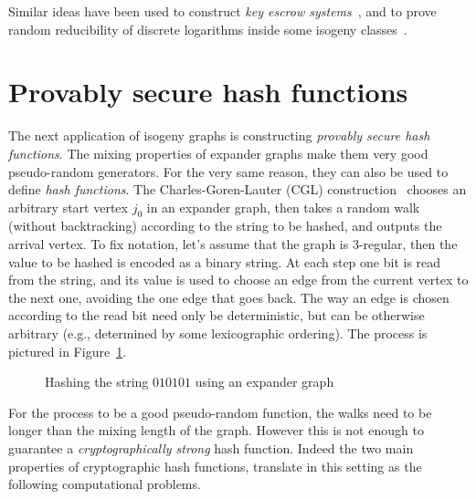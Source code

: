 \documentclass[10pt]{article}
\theoremstyle{plain}
\theoremstyle{definition}
\begin{document}
Similar ideas have been used to construct \emph{key escrow
  systems}~\cite{teske06}, and to prove random reducibility of
discrete logarithms inside some isogeny classes~\cite{JMV}.

\section{Provably secure hash functions}

The next application of isogeny graphs is constructing \emph{provably
  secure hash functions}. %
The mixing properties of expander graphs make them very good
pseudo-random generators. %
For the very same reason, they can also be used to define \emph{hash
  functions}. %
The Charles-Goren-Lauter (CGL)
construction~\cite{charles+lauter+goren09} chooses an arbitrary start
vertex $j_0$ in an expander graph, then takes a random walk (without
backtracking) according to the string to be hashed, and outputs the
arrival vertex. %
To fix notation, let's assume that the graph is $3$-regular, then the
value to be hashed is encoded as a binary string. %
At each step one bit is read from the string, and its value is used to
choose an edge from the current vertex to the next one, avoiding the
one edge that goes back. %
The way an edge is chosen according to the read bit need only be
deterministic, but can be otherwise arbitrary (e.g., determined by
some lexicographic ordering). %
The process is pictured in Figure~\ref{fig:hash}.


\begin{figure}
  \centering
  \caption{Hashing the string $010101$ using an expander graph}
  \label{fig:hash}
\end{figure}

For the process to be a good pseudo-random function, the walks need to
be longer than the mixing length of the graph. %
However this is not enough to guarantee a \emph{cryptographically
  strong} hash function. %
Indeed the two main properties of cryptographic hash functions,
translate in this setting as the following computational problems.
\end{document}
